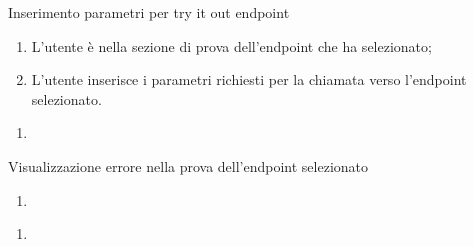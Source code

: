 \begin{usecase}{7.1}{Inserimento parametri per try it out endpoint}\label{uc:inserimento-parametri-per-try-it-out-endpoint}

    \usecasemain{}
        \begin{enumerate}
            \item L'utente è nella sezione di prova dell'endpoint che ha selezionato;
            \item L'utente inserisce i parametri richiesti per la chiamata verso l'endpoint selezionato.
        \end{enumerate}

\end{usecase}


\begin{usecase}{}{}\label{uc:}
    \usecasepre{}
    \usecasedesc{}
    \usecasepost{}

    \usecasemain{}
        \begin{enumerate}
            \item 
        \end{enumerate}

\end{usecase}

\begin{usecase}{8}{Visualizzazione errore nella prova dell'endpoint selezionato}\label{uc:visualizzazione-errore-nella-prova-dell-endpoint-selezionato}
    \usecasepre{}
    \usecasedesc{}
    \usecasepost{}

    \usecasemain{}
        \begin{enumerate}
            \item 
        \end{enumerate}

\end{usecase}


\begin{usecase}{}{}\label{uc:}
    \usecasepre{}
    \usecasedesc{}
    \usecasepost{}

    \usecasemain{}
        \begin{enumerate}
            \item 
        \end{enumerate}

\end{usecase}


